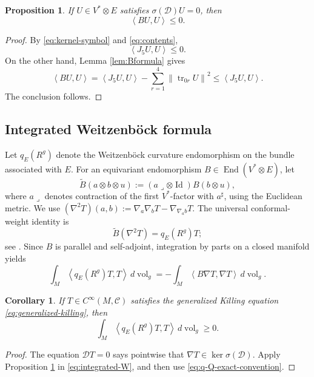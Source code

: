 \documentclass[reqno,11pt]{amsart}
\newtheorem{proposition}[theorem]{Proposition}
\newtheorem{corollary}[theorem]{Corollary}
\theoremstyle{definition}
\newcommand{\cC}{\mathcal C}
\newcommand{\End}{\operatorname{End}}
\newcommand{\Id}{\operatorname{Id}}
\newcommand{\vol}{\operatorname{vol}}
\newcommand{\cD}{\mathcal D}
\newcommand{\inner}[2]{\left\langle #1,#2\right\rangle}
\newcommand{\norm}[1]{\left\lVert #1\right\rVert}
\begin{document}
\begin{proposition}\label{prop:symbol-sign}
If $U\in V^*\otimes E$ satisfies $\sigma(\cD)U=0$, then
$$
  \inner{BU}{U}\leq0.
$$
\end{proposition}

\begin{proof}
By \eqref{eq:kernel-symbol} and \eqref{eq:contents},
$$
  \inner{J_5U}{U}\leq0.
$$
On the other hand, Lemma \ref{lem:Bformula} gives
$$
  \inner{BU}{U}
  =\inner{J_5U}{U}
   -\sum_{r=1}^4\norm{\operatorname{tr}_{0r}U}^2
  \leq\inner{J_5U}{U}.
$$
The conclusion follows.
\end{proof}

\subsection{Integrated Weitzenb\"ock formula}

Let $q_E(R^g)$ denote the Weitzenb\"ock curvature endomorphism on the bundle
associated with $E$. For an equivariant endomorphism
$B\in\End(V^*\otimes E)$, let
$$
  \widetilde B(a\otimes b\otimes u)
  :=(a\mathbin{\lrcorner}\otimes\Id)B(b\otimes u),
$$ where \(a\mathbin{\lrcorner}\) denotes contraction of the
first \(V^*\)-factor with \(a^\sharp\), using the Euclidean metric.
We use $(\nabla^2T)(a,b):=\nabla_a\nabla_bT-\nabla_{\nabla_a b}T$.
The universal conformal-weight identity is
\begin{equation*}
  \widetilde B(\nabla^2T)=q_E(R^g)T;
\end{equation*}
see \cite[Lemma~3.1]{CLMSW25}. Since $B$ is parallel and self-adjoint,
integration by parts on a closed manifold yields
\begin{equation}\label{eq:integrated-W}
  \int_M\inner{q_E(R^g)T}{T}\,d\vol_g
  =-\int_M\inner{B\nabla T}{\nabla T}\,d\vol_g.
\end{equation}

\begin{corollary}\label{cor:integral-sign}
If $T\in C^\infty(M,\cC)$ satisfies the generalized Killing equation
\eqref{eq:generalized-killing}, then
\begin{equation*}
  \int_M\inner{q_E(R^g)T}{T}\,d\vol_g\geq0.
\end{equation*}
\end{corollary}


\begin{proof}
The equation $\cD T=0$ says pointwise that
$\nabla T\in\ker\sigma(\cD)$. Apply Proposition \ref{prop:symbol-sign} in
\eqref{eq:integrated-W}, and then use
\eqref{eq:q-Q-exact-convention}.
\end{proof}
\end{document}
